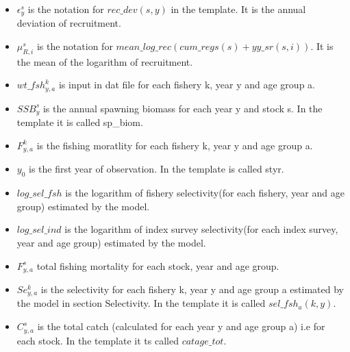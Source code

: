 \documentclass{article}
\begin{document}
\begin{itemize}
    \item $\epsilon^s_y$ is the notation for $rec\_dev(s,y)$ in the template. It is the annual deviation of recruitment. 
    \item $\mu^s_{R,i}$ is the notation for $mean\_log\_rec(cum\_regs(s)+yy\_sr(s,i))$. It is the mean  of the logarithm of recruitment.
    \item $wt\_fsh^{k}_{y,a}$ is input in dat file  for each fishery k, year y and age group a.
    \item $SSB^s_{y}$ is the annual spawning biomass for each year y and stock s. In the template it is called sp\_biom.
    \item $F^{k}_{y,a}$ is the fishing moratlity for each fishery k, year y and age group a.
    \item $y_0$ is the first year of observation. In the template is called styr.
    \item $log\_sel\_fsh$ is the logarithm of fishery selectivity(for each fishery, year and age  group) estimated by the model. 
    \item $log\_sel\_ind$ is the logarithm of index survey selectivity(for each index survey, year and age  group) estimated by the model. 
    \item $F^s_{y,a}$ total fishing mortality for each stock, year and age group.
    \item $Se^k_{y,a}$ is the selectivity for each fishery k, year y and age group a estimated by the model in section Selectivity. In the template it is called $sel\_fsh_a(k,y)$.
    
    \item $C^s_{y,a}$ is the total catch (calculated for each year y  and age group a) i.e for each stock. In the template it ts called $catage\_tot$.


\end{itemize}
\end{document}
